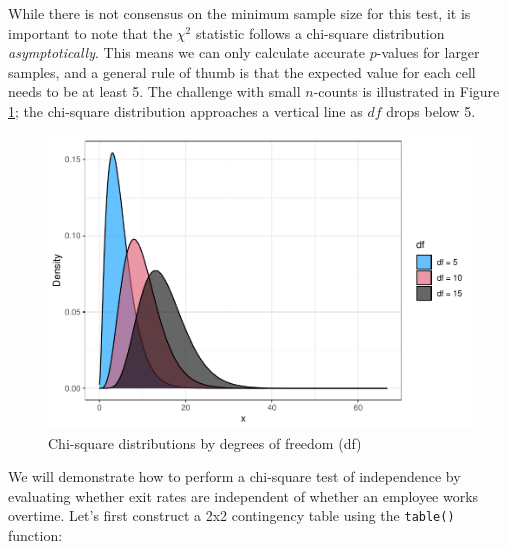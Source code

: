 \documentclass[
]{book}
\newenvironment{Shaded}{\begin{snugshade}}{\end{snugshade}}
\newcommand{\CommentTok}[1]{\textcolor[rgb]{0.56,0.35,0.01}{\textit{#1}}}
\newcommand{\FunctionTok}[1]{\textcolor[rgb]{0.00,0.00,0.00}{#1}}
\newcommand{\NormalTok}[1]{#1}
\newcommand{\OtherTok}[1]{\textcolor[rgb]{0.56,0.35,0.01}{#1}}
\newcommand{\SpecialCharTok}[1]{\textcolor[rgb]{0.00,0.00,0.00}{#1}}
\newcommand{\StringTok}[1]{\textcolor[rgb]{0.31,0.60,0.02}{#1}}
\begin{document}
While there is not consensus on the minimum sample size for this test, it is important to note that the \({\chi}^2\) statistic follows a chi-square distribution \emph{asymptotically}. This means we can only calculate accurate \(p\)-values for larger samples, and a general rule of thumb is that the expected value for each cell needs to be at least 5. The challenge with small \(n\)-counts is illustrated in Figure \ref{fig:chisq-dist}; the chi-square distribution approaches a vertical line as \(df\) drops below 5.

\begin{figure}

{\centering \includegraphics[width=1\linewidth]{The_Fundamentals_of_People_Analytics_files/figure-latex/chisq-dist-1} 

}

\caption{Chi-square distributions by degrees of freedom (df)}\label{fig:chisq-dist}
\end{figure}

We will demonstrate how to perform a chi-square test of independence by evaluating whether exit rates are independent of whether an employee works overtime. Let's first construct a 2x2 contingency table using the \texttt{table()} function:

\begin{Shaded}
\end{Shaded}
\end{document}
